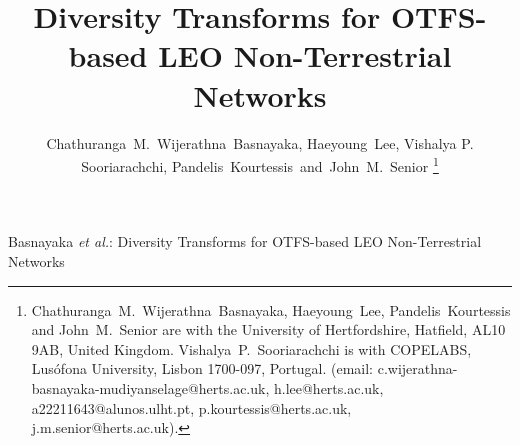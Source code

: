 \documentclass[lettersize,journal]{IEEEtran}
\begin{document}
\title{Diversity Transforms for OTFS-based LEO Non-Terrestrial Networks}

\author{Chathuranga~M.~Wijerathna~Basnayaka, Haeyoung~Lee, Vishalya P. Sooriarachchi, Pandelis~Kourtessis~and~John~M.~Senior%
\thanks{Chathuranga~M.~Wijerathna~Basnayaka, Haeyoung~Lee, 
Pandelis~Kourtessis and John~M.~Senior are with the University 
of Hertfordshire, Hatfield, AL10 9AB, United Kingdom. 
Vishalya~P.~Sooriarachchi is with COPELABS, Lus\'{o}fona 
University, Lisbon 1700-097, Portugal. (email: 
c.wijerathna-basnayaka-mudiyanselage@herts.ac.uk, 
h.lee@herts.ac.uk, a22211643@alunos.ulht.pt, 
p.kourtessis@herts.ac.uk, j.m.senior@herts.ac.uk).}}


%
{Basnayaka \MakeLowercase{\textit{et al.}}: Diversity Transforms for OTFS-based LEO Non-Terrestrial Networks }


\maketitle
\end{document}

